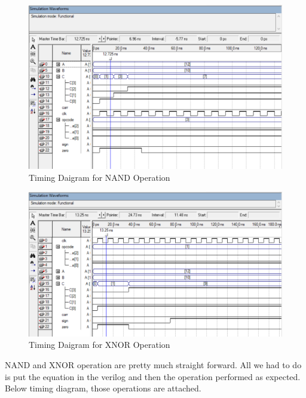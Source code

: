 \begin{figure}[h]
    \begin{center}
        \includegraphics[scale=0.2]{figures/nand}
    \end{center}
    \caption{Timing Daigram for NAND Operation}
    \label{fig:timing nand}
\end{figure}

\begin{figure}[h]
    \begin{center}
        \includegraphics[scale=0.2]{figures/xnor}
    \end{center}
    \caption{Timing Daigram for XNOR Operation}
    \label{fig:timing xnor}
\end{figure}

NAND and XNOR operation are pretty much straight forward.
All we had to do is put the equation in the verilog and then the
operation performed as expected.
Below timing diagram, those operations are attached.
